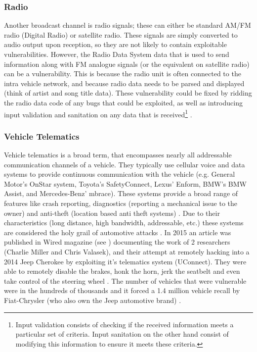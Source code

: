 \subsubsection{Radio} 
\label{subsubsec:radio}

Another broadcast channel is radio signals; these can either be standard AM/FM radio (Digital Radio) or satellite radio. These signals are simply converted to audio output upon reception, so they are not likely to contain exploitable vulnerabilities. However, the Radio Data System data that is used to send information along with FM analogue signals (or the equivalent on satellite radio) can be a vulnerability. This is because the radio unit is often connected to the intra vehicle network, and because radio data needs to be parsed and displayed (think of artist and song title data). These vulnerability could be fixed by ridding the radio data code of any bugs that could be exploited, as well as introducing input validation and sanitation on any data that is received\footnote{Input validation consists of checking if the received information meets a particular set of criteria. Input sanitation on the other hand consist of modifying this information to ensure it meets these criteria.} \cite{MillerA, MillerD, Kosher}.

\subsubsection{Vehicle Telematics} 
\label{subsubsec:telematics}

Vehicle telematics is a broad term, that encompasses nearly all addressable communication channels of a vehicle. They typically use cellular voice and data systems to provide continuous communication with the vehicle (e.g. General Motor's OnStar system, Toyota's SafetyConnect, Lexus' Enform, BMW's BMW Assist, and Mercedes-Benz' mbrace). These systems provide a broad range of features like crash reporting, diagnostics (reporting a mechanical issue to the owner) and anti-theft (location based anti theft systems) \cite{Kosher}. Due to their characteristics (long distance, high bandwidth, addressable, etc.) these systems are considered the holy grail of automotive attacks \cite{MillerA}. In 2015 an article was published in Wired magazine (see \cite{Wired}) documenting the work of 2 researchers (Charlie Miller and Chris Valasek), and their attempt at remotely hacking into a 2014 Jeep Cherokee by exploiting it's telematics system (UConnect). They were able to remotely disable the brakes, honk the horn, jerk the seatbelt and even take control of the steering wheel \cite{Wired}. The number of vehicles that were vulnerable were in the hundreds of thousands and it forced a 1.4 million vehicle recall by Fiat-Chrysler (who also own the Jeep automotive brand) \cite{MillerD}.

